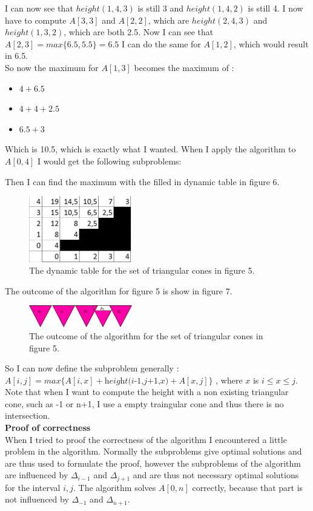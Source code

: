 \documentclass[a4paper,twoside,11pt]{article}
\begin{document}
I can now see that $height(1,4,3)$ is still 3 and  $height(1,4,2)$ is still 4. 
I now have to compute $A[3,3]$ and $A[2,2]$, which are $height(2,4,3)$ and $height(1,3,2)$, which are both 2.5. 
Now I can see that  $A[2,3] = max \{ 6.5, 5.5\} = 6.5$ 
I can do the same for $A[1,2]$, which would result in 6.5. \\ 
So now the maximum for $A[1,3]$ becomes the maximum of : 
\begin{itemize}
\item $ 4  + 6.5$
\item $4 + 4 +  2.5$
\item $6.5 + 3 $
\end{itemize} 
Which is 10.5, which is exactly what I wanted. 
When I apply the algorithm to $A[0,4]$ I would get the following subproblems: 

Then I can find the maximum with the filled in dynamic table in figure 6. 
 \begin{figure}[H]
	\centering
	\includegraphics[width=0.4\textwidth]{A42b.png}
	\caption{The dynamic table for the set of triangular cones in figure 5.}
\end{figure}
The outcome of the algorithm for figure 5 is show in figure 7.
 \begin{figure}[H]
	\centering
	\includegraphics[width=0.4\textwidth]{A42c.png}
	\caption{The outcome of the algorithm for the set of triangular cones in figure 5.}
\end{figure}
So I can now define the subproblem generally : \\ 
$ A[i,j] = max \{ A[i,x] + \textit{height(i-1,j+1,x)} + A[x,j] \}$ , where $x$ is $i \leq x \leq j$. \\
Note that when I want to compute the height with a non existing triangular cone, such as -1 or n+1, I use a empty traingular cone and thus there is no intersection. \\
\textbf{Proof of correctness} \\ 
When I tried to proof the correctness of the algorithm I encountered a little problem in the algorithm. 
Normally the subproblems give optimal solutions and are thus used to formulate the proof, however the subproblems of the algorithm are influenced by $\Delta_{i-1}$ and $\Delta_{j+1}$ and are thus not necessary optimal solutions for the interval $i,j$. 
The algorithm solves $A[0,n]$ correctly, because that part is not influenced by $\Delta_{-1}$ and $\Delta_{n+1}$. 
\end{document}
